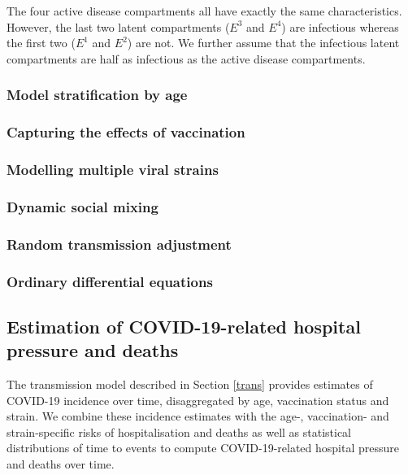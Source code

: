 The four active disease compartments all have exactly the same characteristics. However, the last two latent compartments ($E^3$ and $E^4$) are infectious whereas the first two ($E^1$ and $E^2$) are not. We further assume that 
the infectious latent compartments are half as infectious as the active disease compartments.

\subsubsection{Model stratification by age}
\label{age}


\subsubsection{Capturing the effects of vaccination}
\label{vaccination}


\subsubsection{Modelling multiple viral strains}
 


\subsubsection{Dynamic social mixing}
\label{mixing}
 

\subsubsection{Random transmission adjustment}
\label{random_process}
 

\subsubsection{Ordinary differential equations}
\label{ODEs}
 



\subsection{Estimation of COVID-19-related hospital pressure and deaths}
The transmission model described in Section \ref{trans} provides estimates of COVID-19 incidence over time, disaggregated by age, vaccination status and strain. 
We combine these incidence estimates with the age-, vaccination- and strain-specific risks of hospitalisation and deaths as well as 
statistical distributions of time to events to compute COVID-19-related hospital pressure and deaths over time.

